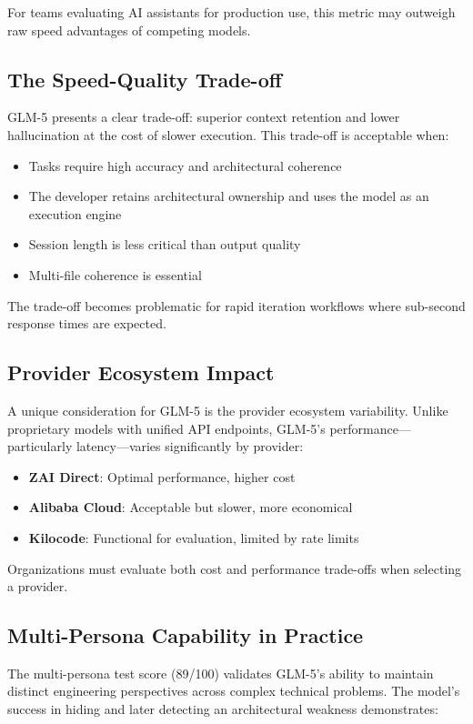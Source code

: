 \documentclass[conference]{IEEEtran}
\begin{document}
For teams evaluating AI assistants for production use, this metric may outweigh raw speed advantages of competing models.

\subsection{The Speed-Quality Trade-off}
GLM-5 presents a clear trade-off: superior context retention and lower hallucination at the cost of slower execution. This trade-off is acceptable when:

\begin{itemize}
    \item Tasks require high accuracy and architectural coherence
    \item The developer retains architectural ownership and uses the model as an execution engine
    \item Session length is less critical than output quality
    \item Multi-file coherence is essential
\end{itemize}

The trade-off becomes problematic for rapid iteration workflows where sub-second response times are expected.

\subsection{Provider Ecosystem Impact}
A unique consideration for GLM-5 is the provider ecosystem variability. Unlike proprietary models with unified API endpoints, GLM-5's performance---particularly latency---varies significantly by provider:

\begin{itemize}
    \item \textbf{ZAI Direct}: Optimal performance, higher cost
    \item \textbf{Alibaba Cloud}: Acceptable but slower, more economical
    \item \textbf{Kilocode}: Functional for evaluation, limited by rate limits
\end{itemize}

Organizations must evaluate both cost and performance trade-offs when selecting a provider.

\subsection{Multi-Persona Capability in Practice}
The multi-persona test score (89/100) validates GLM-5's ability to maintain distinct engineering perspectives across complex technical problems. The model's success in hiding and later detecting an architectural weakness demonstrates:
\end{document}
